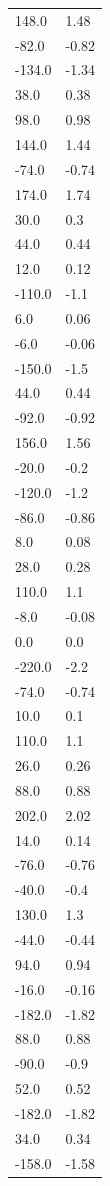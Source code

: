 \begin{longtable}{ll}
148.0 & 1.48 \\
-82.0 & -0.82 \\
-134.0 & -1.34 \\
38.0 & 0.38 \\
98.0 & 0.98 \\
144.0 & 1.44 \\
-74.0 & -0.74 \\
174.0 & 1.74 \\
30.0 & 0.3 \\
44.0 & 0.44 \\
12.0 & 0.12 \\
-110.0 & -1.1 \\
6.0 & 0.06 \\
-6.0 & -0.06 \\
-150.0 & -1.5 \\
44.0 & 0.44 \\
-92.0 & -0.92 \\
156.0 & 1.56 \\
-20.0 & -0.2 \\
-120.0 & -1.2 \\
-86.0 & -0.86 \\
8.0 & 0.08 \\
28.0 & 0.28 \\
110.0 & 1.1 \\
-8.0 & -0.08 \\
0.0 & 0.0 \\
-220.0 & -2.2 \\
-74.0 & -0.74 \\
10.0 & 0.1 \\
110.0 & 1.1 \\
26.0 & 0.26 \\
88.0 & 0.88 \\
202.0 & 2.02 \\
14.0 & 0.14 \\
-76.0 & -0.76 \\
-40.0 & -0.4 \\
130.0 & 1.3 \\
-44.0 & -0.44 \\
94.0 & 0.94 \\
-16.0 & -0.16 \\
-182.0 & -1.82 \\
88.0 & 0.88 \\
-90.0 & -0.9 \\
52.0 & 0.52 \\
-182.0 & -1.82 \\
34.0 & 0.34 \\
-158.0 & -1.58 \\

\end{longtable}
